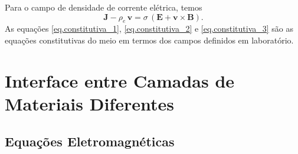 Para o campo de densidade de corrente el\'etrica, temos
\begin{equation}\label{eq.constitutiva_3}
\mathbf{J}-\rho_e\,\mathbf{v}=\sigma\,(\mathbf{E}+\mathbf{v}\times\mathbf{B}).
\end{equation}
As equa\c{c}\~oes \ref{eq.constitutiva_1}, \ref{eq.constitutiva_2} e \ref{eq.constitutiva_3} s\~ao as equa\c{c}\~oes constitutivas do meio em termos dos campos definidos em laborat\'orio. 

\section{Interface entre Camadas de Materiais Diferentes}

\subsection{Equa\c{c}\~oes Eletromagn\'eticas}

